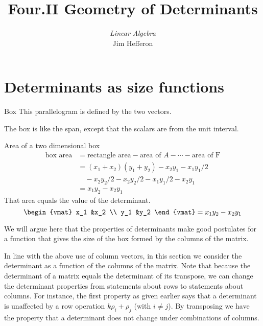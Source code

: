 \documentclass[10pt,t]{beamer}
\title[Geometry of Determinants] %
{Four.II Geometry of Determinants}
\author{\textit{Linear Algebra} \\ {\small Jim Hef{}feron}}
\institute{
  \texttt{http://joshua.smcvt.edu/linearalgebra}
}
\date{}
\begin{document}
\begin{frame}
  \titlepage
\end{frame}




\section{Determinants as size functions}
\begin{frame}{Box}
This parallelogram is defined by the two vectors.

\df[df:Box]

\medskip
The box is like the span, except that the scalars are from the unit 
interval. 
\end{frame}
\begin{frame}{Area of a two dimensional box}
\begin{align*}
  \text{box area}
  &=\text{rectangle area}-\text{area of $A$}-\cdots-\text{area of F} \\
  &=(x_1+x_2)(y_1+y_2)-x_2y_1-x_1y_1/2        \\
    &\quad-x_2y_2/2-x_2y_2/2-x_1y_1/2-x_2y_1         \\
  &=x_1y_2-x_2y_1        
\end{align*}
\pause
That area equals the value of the determinant.
\begin{equation*}
  \begin{vmat}
    x_1  &x_2  \\
    y_1  &y_2
  \end{vmat}
  =x_1y_2-x_2y_1
\end{equation*}
\end{frame}
\begin{frame}
We will argue here that
the properties of determinants 
make good postulates for a function 
that gives the size of the box formed by the columns of the matrix.  

\pause
In line with the above use of column vectors,
in this section we consider the determinant as a function of the columns
of the matrix.
Note that because the determinant of a matrix equals 
the determinant of its transpose, we can change the determinant properties
from statements about rows to statements about columns.
For instance, the first property as given earlier says that a
determinant is unaffected by a row operation $k\rho_i+\rho_j$ (with $i\neq j$).
By transposing we have the property that a determinant
does not change under combinations of columns. 
\end{frame}
\end{document}
